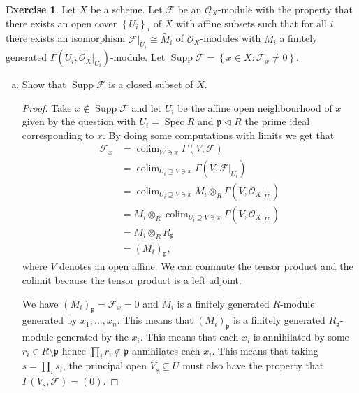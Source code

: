 \documentclass{article}
\newcommand{\sheaf}{\mathcal{O}}
\newcommand{\primeid}{\mathfrak{p}}
\DeclareMathOperator{\colim}{colim}
\newcommand{\set}[1]{\left\{#1\right\}}
\newcommand{\setwith}[2]{\left\{#1:#2\right\}}
\DeclareMathOperator{\spec}{Spec}
\DeclareMathOperator{\supp}{Supp}
\newcommand{\ideal}{\triangleleft}
\theoremstyle{definition}
\newtheorem{question}{Exercise}
\begin{document}
\begin{question}
    Let \(X\) be a scheme. Let \(\mathcal{F}\) be an \(\sheaf_{X}\)-module with
    the property that there exists an open cover \(\set{U_{i}}_{i}\) of \(X\)
    with affine subsets such that for all \(i\) there exists an isomorphism
    \(\mathcal{F}|_{U_{i}}\cong\tilde{M_{i}}\) of \(\sheaf_{X}\)-modules with
    \(M_{i}\) a finitely generated \(\Gamma(U_{i},\sheaf_{X}|_{U_{i}})\)-module.
    Let \(\supp\mathcal{F}=\setwith{x\in X}{\mathcal{F}_{x}\neq 0}\).

    \begin{enumerate}[(a)]
        \item Show that \(\supp\mathcal{F}\) is a closed subset of \(X\).

              \begin{proof}
                  Take \(x\notin\supp\mathcal{F}\) and let \(U_{i}\) be the
                  affine open neighbourhood of \(x\) given by the question with
                  \(U_{i}=\spec R\) and \(\primeid\ideal R\) the prime ideal
                  corresponding to \(x\). By doing some computations with limits
                  we get that
                  \begin{align*}
                      \mathcal{F}_{x} & =\colim_{W\ni x}\Gamma(V,\mathcal{F})                                        \\
                                      & =\colim_{U_{i}\supseteq V\ni x}\Gamma(V,\mathcal{F}|_{U_{i}})                \\
                                      & =\colim_{U_{i}\supseteq V\ni x}M_{i}\otimes_{R}\Gamma(V,\sheaf_{X}|_{U_{i}}) \\
                                      & =M_{i}\otimes_{R}\colim_{U_{i}\supseteq V\ni x}\Gamma(V,\sheaf_{X}|_{U_{i}}) \\
                                      & =M_{i}\otimes_{R}R_{\primeid}                                                \\
                                      & =(M_{i})_{\primeid},
                  \end{align*}
                  where \(V\) denotes an open affine. We can commute the tensor
                  product and the colimit because the tensor product is a left
                  adjoint.

                  We have \((M_{i})_{\primeid}=\mathcal{F}_{x}=0\) and \(M_{i}\)
                  is a finitely generated \(R\)-module generated by
                  \(x_{1},\ldots,x_{n}\). This means that \((M_{i})_{\primeid}\)
                  is a finitely generated \(R_{\primeid}\)-module generated by
                  the \(x_{i}\). This means that each \(x_{i}\) is annihilated
                  by some \(r_{i}\in R\setminus\primeid\) hence
                  \(\prod_{i}r_{i}\notin\primeid\) annihilates each \(x_{i}\).
                  This means that taking \(s=\prod_{i}s_{i}\), the principal
                  open \(V_{s}\subseteq U\) must also have the property that
                  \(\Gamma(V_{s},\mathcal{F})=(0)\).
              \end{proof}


\end{enumerate}
\end{question}
\end{document}
